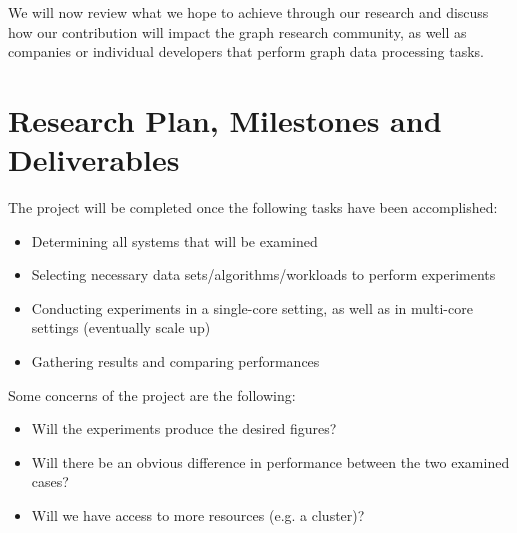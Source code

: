 \documentclass[a4paper,11pt]{article}
\begin{document}
We will now review what we hope to achieve through our research and discuss how our contribution will impact the graph research community, as well as companies or individual developers that perform graph data processing tasks.




\section{Research Plan, Milestones and Deliverables} \label{milestones}

The project will be completed once the following tasks have been accomplished:
\begin{itemize}
    \item Determining all systems that will be examined
    \item Selecting necessary data sets/algorithms/workloads to perform experiments
    \item Conducting experiments in a single-core setting, as well as in multi-core settings (eventually scale up)
    \item Gathering results and comparing performances
    
\end{itemize}

Some concerns of the project are the following:
\begin{itemize}
    \item Will the experiments produce the desired figures?
    \item Will there be an obvious difference in performance between the two examined cases?
    \item Will we have access to more resources (e.g. a cluster)?
\end{itemize}
\end{document}
